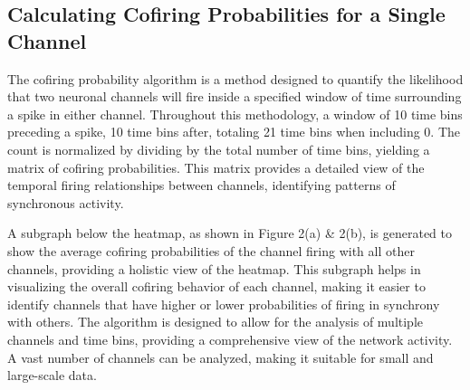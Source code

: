 \documentclass{article} %
\begin{document}
\subsection{Calculating Cofiring Probabilities for a Single Channel}

The cofiring probability algorithm is a method designed to quantify the likelihood that two neuronal channels will fire inside a specified window of time surrounding a spike in either channel. Throughout this methodology, a window of 10 time bins preceding a spike, 10 time bins after, totaling 21 time bins when including 0. The count is normalized by dividing by the total number of time bins, yielding a matrix of cofiring probabilities. This matrix provides a detailed view of the temporal firing relationships between channels, identifying patterns of synchronous activity.

A subgraph below the heatmap, as shown in Figure 2(a) \& 2(b), is generated to show the average cofiring probabilities of the channel firing with all other channels, providing a holistic view of the heatmap. This subgraph helps in visualizing the overall cofiring behavior of each channel, making it easier to identify channels that have higher or lower probabilities of firing in synchrony with others. The algorithm is designed to allow for the analysis of multiple channels and time bins, providing a comprehensive view of the network activity. A vast number of channels can be analyzed, making it suitable for small and large-scale data.
\end{document}
